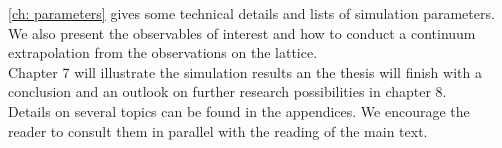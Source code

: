 %
\autoref{ch: parameters} gives some technical details and lists of simulation parameters. We also present the observables of interest and how to conduct a continuum extrapolation from the observations on the lattice.\\
%
Chapter 7 will illustrate the simulation results an the thesis will finish with a conclusion and an outlook on further research possibilities in chapter 8.\\
%
Details on several topics can be found in the appendices. We encourage the reader to consult them in parallel with the reading of the main text.
